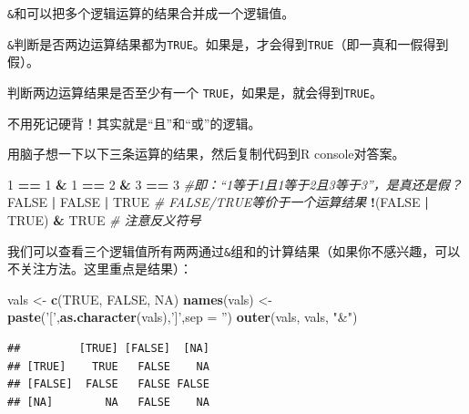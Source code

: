 \documentclass[]{book}
\newenvironment{Shaded}{\begin{snugshade}}{\end{snugshade}}
\newcommand{\CommentTok}[1]{\textcolor[rgb]{0.56,0.35,0.01}{\textit{#1}}}
\newcommand{\DataTypeTok}[1]{\textcolor[rgb]{0.13,0.29,0.53}{#1}}
\newcommand{\DecValTok}[1]{\textcolor[rgb]{0.00,0.00,0.81}{#1}}
\newcommand{\KeywordTok}[1]{\textcolor[rgb]{0.13,0.29,0.53}{\textbf{#1}}}
\newcommand{\NormalTok}[1]{#1}
\newcommand{\OperatorTok}[1]{\textcolor[rgb]{0.81,0.36,0.00}{\textbf{#1}}}
\newcommand{\OtherTok}[1]{\textcolor[rgb]{0.56,0.35,0.01}{#1}}
\newcommand{\StringTok}[1]{\textcolor[rgb]{0.31,0.60,0.02}{#1}}
\begin{document}
\texttt{\&}和\texttt{\textbar{}}可以把多个逻辑运算的结果合并成一个逻辑值。

\texttt{\&}判断是否两边运算结果都为\texttt{TRUE}。如果是，才会得到\texttt{TRUE}（即一真和一假得到假）。

\texttt{\textbar{}}判断两边运算结果是否至少有一个 \texttt{TRUE}，如果是，就会得到\texttt{TRUE}。

不用死记硬背！其实就是``且''和``或''的逻辑。

用脑子想一下以下三条运算的结果，然后复制代码到R console对答案。

\begin{Shaded}
\begin{Highlighting}[]
\DecValTok{1} \OperatorTok{==}\StringTok{ }\DecValTok{1} \OperatorTok{&}\StringTok{ }\DecValTok{1} \OperatorTok{==}\StringTok{ }\DecValTok{2} \OperatorTok{&}\StringTok{ }\DecValTok{3} \OperatorTok{==}\StringTok{ }\DecValTok{3} \CommentTok{#即：“1等于1且1等于2且3等于3”，是真还是假？}
\OtherTok{FALSE} \OperatorTok{|}\StringTok{ }\OtherTok{FALSE} \OperatorTok{|}\StringTok{ }\OtherTok{TRUE} \CommentTok{# FALSE/TRUE等价于一个运算结果}
\OperatorTok{!}\NormalTok{(}\OtherTok{FALSE} \OperatorTok{|}\StringTok{ }\OtherTok{TRUE}\NormalTok{) }\OperatorTok{&}\StringTok{ }\OtherTok{TRUE} \CommentTok{# 注意反义符号}
\end{Highlighting}
\end{Shaded}

我们可以查看三个逻辑值所有两两通过\texttt{\&}组和的计算结果（如果你不感兴趣，可以不关注方法。这里重点是结果）：

\begin{Shaded}
\begin{Highlighting}[]
\NormalTok{vals <-}\StringTok{ }\KeywordTok{c}\NormalTok{(}\OtherTok{TRUE}\NormalTok{, }\OtherTok{FALSE}\NormalTok{, }\OtherTok{NA}\NormalTok{) }
\KeywordTok{names}\NormalTok{(vals) <-}\StringTok{ }\KeywordTok{paste}\NormalTok{(}\StringTok{'['}\NormalTok{,}\KeywordTok{as.character}\NormalTok{(vals),}\StringTok{']'}\NormalTok{,}\DataTypeTok{sep =} \StringTok{''}\NormalTok{)}
\KeywordTok{outer}\NormalTok{(vals, vals, }\StringTok{"&"}\NormalTok{)}
\end{Highlighting}
\end{Shaded}

\begin{verbatim}
##         [TRUE] [FALSE]  [NA]
## [TRUE]    TRUE   FALSE    NA
## [FALSE]  FALSE   FALSE FALSE
## [NA]        NA   FALSE    NA
\end{verbatim}
\end{document}
